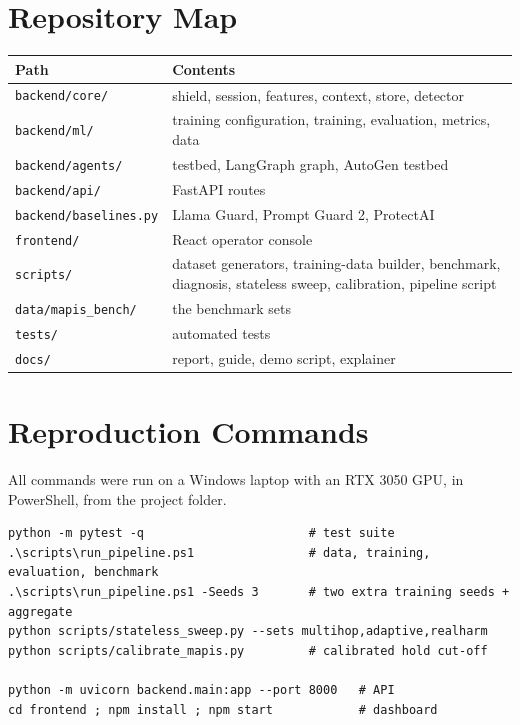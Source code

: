 \section{Repository Map}
\begin{table}[H]
\centering\small
\begin{tabular}{p{4.2cm}p{8.5cm}}
\toprule
Path & Contents\\
\midrule
\texttt{backend/core/} & shield, session, features, context, store, detector\\
\texttt{backend/ml/} & training configuration, training, evaluation, metrics, data\\
\texttt{backend/agents/} & testbed, LangGraph graph, AutoGen testbed\\
\texttt{backend/api/} & FastAPI routes\\
\texttt{backend/baselines.py} & Llama Guard, Prompt Guard 2, ProtectAI\\
\texttt{frontend/} & React operator console\\
\texttt{scripts/} & dataset generators, training-data builder, benchmark, diagnosis, stateless sweep, calibration, pipeline script\\
\texttt{data/mapis\_bench/} & the benchmark sets\\
\texttt{tests/} & automated tests\\
\texttt{docs/} & report, guide, demo script, explainer\\
\bottomrule
\end{tabular}
\end{table}

\section{Reproduction Commands}
All commands were run on a Windows laptop with an RTX 3050 GPU, in PowerShell, from the project folder.
\begin{lstlisting}
python -m pytest -q                       # test suite
.\scripts\run_pipeline.ps1                # data, training, evaluation, benchmark
.\scripts\run_pipeline.ps1 -Seeds 3       # two extra training seeds + aggregate
python scripts/stateless_sweep.py --sets multihop,adaptive,realharm
python scripts/calibrate_mapis.py         # calibrated hold cut-off

python -m uvicorn backend.main:app --port 8000   # API
cd frontend ; npm install ; npm start            # dashboard
\end{lstlisting}

